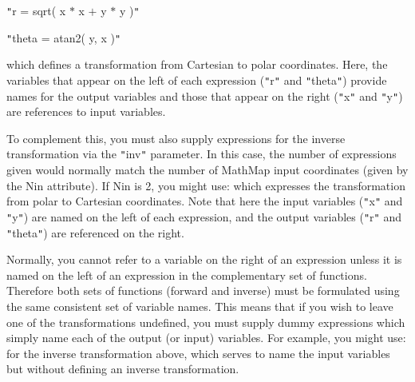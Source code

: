\documentclass[twoside,11pt]{article}
\begin{document}
{{{         \sstitem
         {\tt{"}}r = sqrt( x $*$ x $+$ y $*$ y ){\tt{"}}

         \sstitem
         {\tt{"}}theta = atan2( y, x ){\tt{"}}

      }
      which defines a transformation from Cartesian to polar
      coordinates. Here, the variables that appear on the left of each
      expression ({\tt{"}}r{\tt{"}} and {\tt{"}}theta{\tt{"}}) provide names for the output variables
      and those that appear on the right ({\tt{"}}x{\tt{"}} and {\tt{"}}y{\tt{"}}) are references to
      input variables.

      To complement this, you must also supply expressions for the inverse
      transformation via the {\tt{"}}inv{\tt{"}} parameter.  In this case, the number of
      expressions given would normally match the number of MathMap input
      coordinates (given by the Nin attribute).  If Nin is 2, you might use:
      which expresses the transformation from polar to Cartesian
      coordinates. Note that here the input variables ({\tt{"}}x{\tt{"}} and {\tt{"}}y{\tt{"}}) are
      named on the left of each expression, and the output variables ({\tt{"}}r{\tt{"}}
      and {\tt{"}}theta{\tt{"}}) are referenced on the right.

      Normally, you cannot refer to a variable on the right of an expression
      unless it is named on the left of an expression in the complementary
      set of functions. Therefore both sets of functions (forward and
      inverse) must be formulated using the same consistent set of variable
      names. This means that if you wish to leave one of the transformations
      undefined, you must supply dummy expressions which simply name each of
      the output (or input) variables.  For example, you might use:
      for the inverse transformation above, which serves to name the input
      variables but without defining an inverse transformation.
   }
   }
\end{document}

